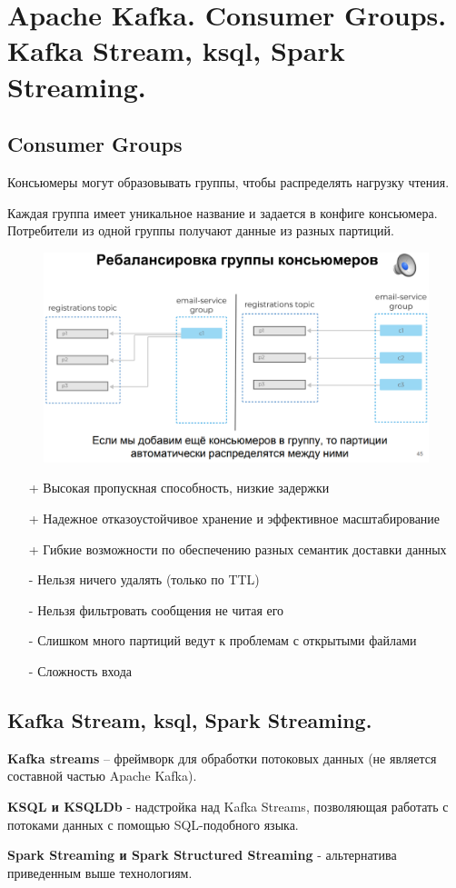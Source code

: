 \section{Apache Kafka. Consumer Groups. Kafka Stream, ksql, Spark Streaming.}

\subsection*{Consumer Groups}

Консьюмеры могут образовывать группы, чтобы распределять нагрузку 
чтения.

Каждая группа имеет уникальное название и задается в конфиге консьюмера. 
Потребители из одной группы получают данные из разных партиций.

\begin{figure}[ht]
	\centering
	\begin{minipage}[b]{0.65\textwidth}
		\includegraphics[width=\textwidth]{images/cgreb.png}
	\end{minipage}
\end{figure}

\begin{itemize}
    \item[+] Высокая пропускная способность, низкие задержки
    \item[+] Надежное отказоустойчивое хранение и эффективное масштабирование
    \item[+] Гибкие возможности по обеспечению разных семантик доставки данных
    \item[-] Нельзя ничего удалять (только по TTL)
    \item[-] Нельзя фильтровать сообщения не читая его
    \item[-] Слишком много партиций ведут к проблемам с открытыми файлами
    \item[-] Сложность входа
\end{itemize}


\subsection*{Kafka Stream, ksql, Spark Streaming.}

\textbf{Kafka streams} – фреймворк для обработки потоковых данных (не 
является составной частью Apache Kafka).

\textbf{KSQL и KSQLDb} - надстройка над Kafka Streams, позволяющая работать 
с потоками данных с помощью SQL-подобного языка.

\textbf{Spark Streaming и Spark Structured Streaming} - альтернатива 
приведенным выше технологиям.